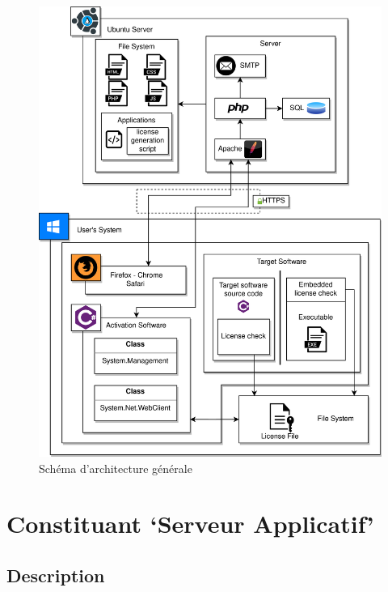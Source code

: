 \begin{figure}[h!]
	\centering
	\includegraphics{../png/DAT_general.png}
	\caption{Schéma d'architecture générale}
	\label{fig:fig1}
\end{figure}
\newpage

\section{Constituant `Serveur Applicatif'}

\subsection{Description}

